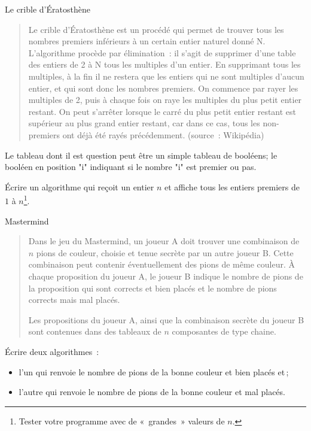	\begin{Exercice}{Le crible d’Ératosthène}

		\begin{quote}
			\og{} Le crible d’Ératosthène est un procédé 
			qui permet de trouver tous les nombres premiers inférieurs 
			à un certain entier naturel donné N.
			L’algorithme procède par élimination~: 
			il s’agit de supprimer d’une table des entiers de 2 à N 
			tous les multiples d’un entier. 
			En supprimant tous les multiples, 
			à la fin il ne restera que les entiers qui ne sont multiples d’aucun entier, 
			et qui sont donc les nombres premiers.
			On commence par rayer les multiples de 2, 
			puis à chaque fois on raye les multiples du plus petit entier restant.
			On peut s’arrêter lorsque le carré du plus petit entier restant 
			est supérieur au plus grand entier restant, car dans ce cas, 
			tous les non-premiers ont déjà été rayés précédemment.\fg{}
			(source~: Wikipédia)
		\end{quote}
		
		Le tableau dont il est question peut être un simple tableau
		de booléens; le booléen en position "i" indiquant 
		si le nombre "i" est premier ou pas.

		Écrire un algorithme qui reçoit un entier $n$ et affiche tous les
		entiers premiers de $1$ à $n$\footnote{Tester votre programme avec de
		«~grandes~» valeurs de $n$.}.

	\end{Exercice}
	
	\begin{Exercice}{Mastermind}
		
		\begin{quote}
		
			Dans le jeu du Mastermind, un joueur A doit trouver une combinaison
			de $n$ pions de couleur, choisie et tenue secrète par un autre
			joueur B.  Cette combinaison peut contenir éventuellement des pions
			de même couleur.  À chaque proposition du joueur A, le joueur
			B indique le nombre de pions de la proposition qui sont corrects et
			bien placés et le nombre de pions corrects mais mal placés. 
		
			Les propositions du joueur A, ainsi que la combinaison secrète du
			joueur B sont contenues dans des tableaux de $n$ composantes de
			type chaine.
		
		\end{quote}
		
		Écrire deux algorithmes~:

		\begin{itemize}
			\item l'un qui renvoie le nombre de pions de la bonne couleur et 
				bien placés et\,;
			\item l'autre qui renvoie le nombre de pions de la bonne couleur 
				et mal placés. 
		\end{itemize}

	\end{Exercice}
	

